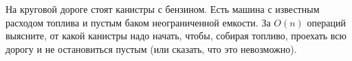 \documentclass{article}
\begin{document}
На круговой дороге стоят канистры с бензином. Есть машина с известным расходом топлива и пустым баком неограниченной емкости. 
За $O(n)$ операций выясните, от какой канистры надо начать, чтобы, собирая топливо, проехать всю дорогу и не остановиться пустым (или сказать, что это невозможно).
\end{document}
